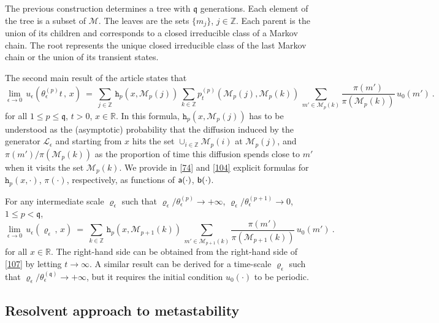 \documentclass[reqno]{amsart}
\theoremstyle{plain}
\theoremstyle{definition}
\newcommand{\mc}[1]{{\mathcal #1}}
\newcommand{\mf}[1]{{\mathfrak #1}}
\newcommand{\bb}[1]{{\mathbb #1}}
\newcommand{\ms}[1]{{\mathscr #1}}
\newcommand{\mss}[1]{{\textsf #1}}
\newcommand{\mtt}[1]{{\mathtt #1}}
\newcounter{as}[section]
\newcommand{\<}{\langle}
\renewcommand{\>}{\rangle}
\begin{document}
The previous construction determines a tree with $\mf q$
generations. Each element of the tree is a subset of $\mc M$.  The
leaves are the sets $\{m_j\}$, $j\in \bb Z$. Each parent is the union
of its children and corresponds to a closed irreducible class of a
Markov chain. The root represents the unique closed irreducible class
of the last Markov chain or the union of its transient states.

The second main result of the article states that 
\begin{equation}
\label{107}
\lim_{\epsilon\to0}\,
u_{\epsilon}(\theta_{\epsilon}^{(p)}t\,,\,x) \ =\
\sum_{j\in\bb Z}\,
\mtt h_p (x , \ms M_p(j))\, \sum_{k\in\bb Z}
p_{t}^{(p)}(\ms M_p(j), \ms M_p(k))\,
\sum_{m'\in \ms M_p(k)}
\frac{\pi(m')}{\pi(\ms M_p(k))}
\,u_{0}(m')\ .
\end{equation}
for all $1\le p\le \mf q$, $t>0$, $x\in \bb R$.  In this formula,
$\mtt h_p (x , \ms M_p(j))$ has to be understood as the (asymptotic)
probability that the diffusion induced by the generator
$\ms L_\epsilon$ and starting from $x$ hits the set
$\cup_{i\in \bb Z} \ms M_p(i)$ at $\ms M_p(j)$, and
$\pi(m')/\pi(\ms M_p(k))$ as the proportion of time this diffusion
spends close to $m'$ when it visits the set $\ms M_p(k)$.
We provide in \eqref{74} and \eqref{104} explicit formulas for
$\mtt h_p (x , \cdot)$, $\pi(\cdot)$, respectively, as functions of
$\mss a(\cdot)$, $\mss b(\cdot)$.

For any intermediate scale $\varrho_\epsilon$ such that
$\varrho_\epsilon / \theta^{(p)}_{\epsilon} \to +\infty$,
$\varrho_\epsilon / \theta^{(p+1)}_{\epsilon} \to 0$, $1\le p< \mf
q$,
\begin{equation}
\label{107b}
\lim_{\epsilon\to0}\,
u_{\epsilon}(\varrho_\epsilon \,,\,x) \ =\
\sum_{k\in\bb Z}\,
\mtt h_p (x , \ms M_{p+1}(k))\, 
\sum_{m'\in \ms M_{p+1}(k)}
\frac{\pi(m')}{\pi(\ms M_{p+1}(k))}
\,u_{0}(m')\ .
\end{equation}
for all $x\in \bb R$. The right-hand side can be obtained from the
right-hand side of \eqref{107} by letting $t\to\infty$.  A similar
result can be derived for a time-scale $\varrho_\epsilon$ such that
$\varrho_\epsilon / \theta^{(\mf q)}_{\epsilon} \to +\infty$, but it
requires the initial condition $u_0(\cdot)$ to be periodic.

\subsection*{Resolvent approach to metastability}
\end{document}
